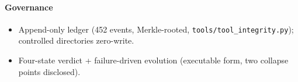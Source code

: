 \paragraph{Governance}
\begin{itemize}
  \item Append-only ledger (452 events, Merkle-rooted, \texttt{tools/tool\_integrity.py}); controlled directories zero-write.
  \item Four-state verdict + failure-driven evolution (executable form, two collapse points disclosed).
\end{itemize}
